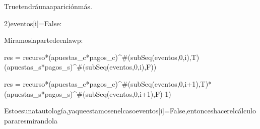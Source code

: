 {True\hspace{3}tendr\'a\hspace{3}una\hspace{3}aparici\'on\hspace{3}m\'as.
\vspace{0.4cm}

2)eventos[i]=False:
\vspace{0.2cm}

Miramos\hspace{3}la\hspace{3}parte\hspace{3}de\hspace{3}\heartsuit\hspace{3}en\hspace{3}la\hspace{3}wp:
\vspace{0.4cm}

res = recurso*(apuestas_c*pagos_c)^{\#(subSeq(eventos,0,i),T)}(apuestas_s*pagos_s)^{\#(subSeq(eventos,0,i),F)})
\vspace{0.2cm}

\rightarrow res = recurso*(apuestas_c*pagos_c)^{\#(subSeq(eventos,0,i+1),T)}*(apuestas_s*pagos_s)^{\#(subSeq(eventos,0,i+1),F)-1})
\vspace{0.4cm}

Esto\hspace{3}es\hspace{3}una\hspace{3}tautolog\'ia,\hspace{3}ya\hspace{3}que\hspace{3}estamos\hspace{3}en\hspace{3}el\hspace{3}caso\hspace{3}eventos[i]=False,\hspace{3}entonces\hspace{3}hacer\hspace{3}el\hspace{3}c\'alculo\hspace{3}para\hspace{3}res\hspace{3}mirando\hspace{3}la
\vspace{0.1cm}

}
